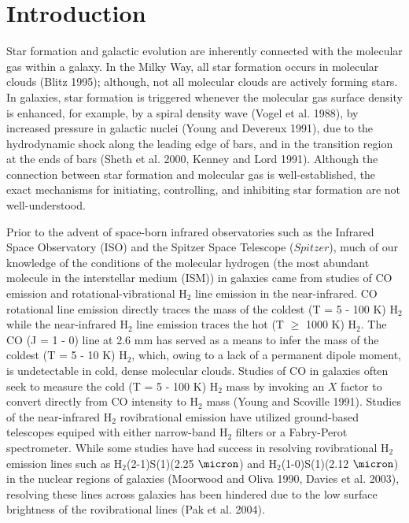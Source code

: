\documentclass[manuscript]{aastex}
\begin{document}

\section{Introduction}

Star formation and galactic evolution are inherently connected with the molecular gas within a galaxy.  In the Milky Way, all star formation occurs in molecular clouds (Blitz 1995); although, not all molecular clouds are actively forming stars.  In galaxies, star formation is triggered whenever the molecular gas surface density is enhanced, for example, by a spiral density wave (Vogel et al. 1988), by increased pressure in galactic nuclei (Young and Devereux 1991),  due to the hydrodynamic shock along the leading edge of bars, and in the transition region at the ends of bars (Sheth et al. 2000, Kenney and Lord 1991).  Although the connection between star formation and molecular gas is well-established, the exact mechanisms for initiating, controlling, and inhibiting star formation are not well-understood.

Prior to the advent of space-born infrared observatories such as the Infrared Space Observatory (ISO) and the Spitzer Space Telescope ($Spitzer$), much of our knowledge of the conditions of the molecular hydrogen (the most abundant molecule in the interstellar medium (ISM)) in galaxies came from studies of CO emission and rotational-vibrational $\mathrm{H_2}$ line emission in the near-infrared.  CO rotational line emission directly traces the mass of the coldest (T = 5 - 100 K) $\mathrm{H_2}$ while the near-infrared  $\mathrm{H_2}$ line emission traces the hot (T  $\geq$ 1000 K) $\mathrm{H_2}$.  The CO (J = 1 - 0) line at 2.6 mm has served as a means to infer the mass of the coldest (T = 5 - 10 K) $\mathrm{H_2}$, which, owing to a lack of a permanent dipole moment, is undetectable in cold, dense molecular clouds.  Studies of CO in galaxies often seek to measure the cold (T = 5 - 100 K) $\mathrm{H_2}$ mass by invoking an $X$ factor to convert directly from CO intensity to $\mathrm{H_2}$ mass (Young and Scoville 1991).  Studies of the near-infrared $\mathrm{H_2}$ rovibrational emission have utilized ground-based telescopes equiped with either narrow-band $\mathrm{H_2}$ filters or a Fabry-Perot spectrometer.  While some studies have had success in resolving rovibrational $\mathrm{H_2}$ emission lines such as $\mathrm{H_2}$(2-1)S(1)(2.25 $\micron$) and $\mathrm{H_2}$(1-0)S(1)(2.12 $\micron$) in the nuclear regions of galaxies (Moorwood and Oliva 1990, Davies et al. 2003), resolving these lines across galaxies has been hindered due to the low surface brightness of the rovibrational lines (Pak et al. 2004).
\end{document}
